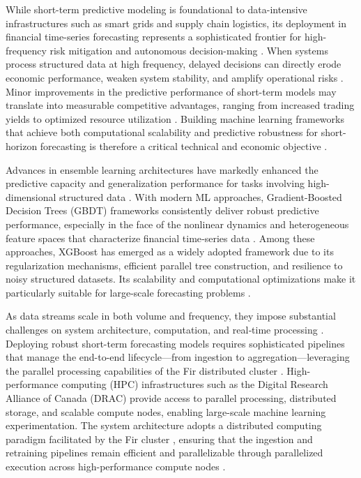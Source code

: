 \documentclass[conference]{IEEEtran}
\begin{document}
While short-term predictive modeling is foundational to data-intensive infrastructures such as smart grids and supply chain logistics, its deployment in financial time-series forecasting represents a sophisticated frontier for high-frequency risk mitigation and autonomous decision-making \cite{fischer2018deep, ghoddusi2019machine}. When systems process structured data at high frequency, delayed decisions can directly erode economic performance, weaken system stability, and amplify operational risks \cite{lim2021time}. Minor improvements in the predictive performance of short-term models may translate into measurable competitive advantages, ranging from increased trading yields to optimized resource utilization \cite{gu2020empirical,mullainathan2017machine}. Building machine learning frameworks that achieve both computational scalability and predictive robustness for short-horizon forecasting is therefore a critical technical and economic objective \cite{chen2016xgboost, drac2024infrastructure, gu2020empirical}. 

Advances in ensemble learning architectures have markedly enhanced the predictive capacity and generalization performance for tasks involving high-dimensional structured data \cite{chen2016xgboost}. With modern ML approaches, Gradient-Boosted Decision Trees (GBDT) frameworks consistently deliver robust predictive performance, especially in the face of the nonlinear dynamics and heterogeneous feature spaces that characterize financial time‑series data \cite{chen2016xgboost, friedman2001greedy}. Among these approaches, XGBoost has emerged as a widely adopted framework due to its regularization mechanisms, efficient parallel tree construction, and resilience to noisy structured datasets. Its scalability and computational optimizations make it particularly suitable for large-scale forecasting problems \cite{chen2016xgboost}. 

As data streams scale in both volume and frequency, they impose substantial challenges on system architecture, computation, and real‑time processing \cite{Stonebraker2005OneSize}. Deploying robust short-term forecasting models requires sophisticated pipelines that manage the end-to-end lifecycle—from ingestion to aggregation—leveraging the parallel processing capabilities of the Fir distributed cluster \cite{drac2024infrastructure, Colonnelli2021StreamFlow}. High-performance computing (HPC) infrastructures such as the Digital Research Alliance of Canada (DRAC) provide access to parallel processing, distributed storage, and scalable compute nodes, enabling large-scale machine learning experimentation. The system architecture adopts a distributed computing paradigm facilitated by the Fir cluster \cite{drac2026hpc}, ensuring that the ingestion and retraining pipelines remain efficient and parallelizable through parallelized execution across high-performance compute nodes \cite{chen2016xgboost}.
\end{document}
